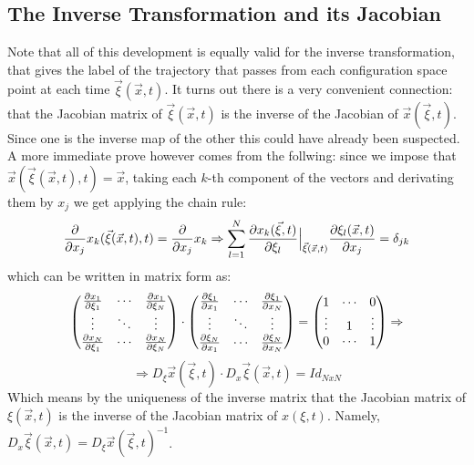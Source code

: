 \documentclass[11pt, a4paper]{article} %
\begin{document}
\subsection*{ The Inverse Transformation and its Jacobian\vspace{-0.2cm}}
Note that all of this development is equally valid for the inverse transformation, that gives the label of the trajectory that passes from each configuration space point at each time $\vec{\xi}(\vec{x},t)$. It turns out there is a very convenient connection: that the Jacobian matrix of $\vec{\xi}(\vec{x},t)$ is the inverse of the Jacobian of $\vec{x}(\vec{\xi},t)$. Since one is the inverse map of the other this could have already been suspected. A more immediate prove however comes from the follwing: since we impose that $\vec{x}(\vec{\xi}(\vec{x},t),t)=\vec{x}$, taking each $k$-th component of the vectors and derivating them by $x_j$ we get applying the chain rule:
\begin{equation}
\pdv{}{x_j}x_k(\vec{\xi}(\vec{x},t),t)=\pdv{}{x_j}x_k \Rightarrow \sum_{l=1}^N \pdv{x_k(\vec{\xi},t)}{\xi_l}\Big\rvert_{\vec{\xi}(\vec{x},t)}\pdv{\xi_l(\vec{x},t)}{x_j}=\delta_{jk}
\end{equation}
which can be written in matrix form as:
\begin{equation}\label{inverse}
\begin{pmatrix}
\pdv{x_1}{\xi_1}&\cdots&\pdv{x_1}{\xi_N} \\
\vdots &\ddots& \vdots \\
\pdv{x_N}{\xi_1}&\cdots&\pdv{x_N}{\xi_N}
\end{pmatrix}\cdot \begin{pmatrix}
\pdv{\xi_1}{x_1}&\cdots&\pdv{\xi_1}{x_N} \\
\vdots & \ddots & \vdots \\
\pdv{\xi_N}{x_1}&\cdots&\pdv{\xi_N}{x_N}
\end{pmatrix}=\begin{pmatrix}
1&\cdots &0 \\
\vdots & 1& \vdots \\
0&\cdots &1
\end{pmatrix}\Rightarrow
\end{equation}
$$
\Rightarrow D_\xi \vec{x}(\vec{\xi},t)\cdot D_x \vec{\xi}(\vec{x},t) = Id_{NxN}
$$
Which means by the uniqueness of the inverse matrix that the Jacobian matrix of $\xi(\vec{x},t)$ is the inverse of the Jacobian matrix of $x(\xi,t)$. Namely, $D_x \vec{\xi}(\vec{x},t)=D_\xi \vec{x}(\vec{\xi},t)^{-1}$.
\end{document}
